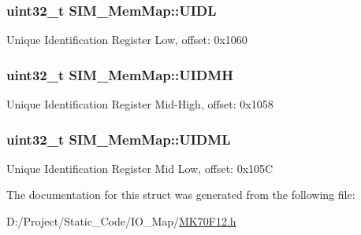 \subsubsection[{U\+I\+D\+L}]{\setlength{\rightskip}{0pt plus 5cm}uint32\+\_\+t S\+I\+M\+\_\+\+Mem\+Map\+::\+U\+I\+D\+L}\label{struct_s_i_m___mem_map_ac23a694afa8d84e55fc43ff0c0ec1b29}
Unique Identification Register Low, offset\+: 0x1060 \hypertarget{struct_s_i_m___mem_map_af4fb6d5bc3fa71f9c905570d87a2e93f}{}
\subsubsection[{U\+I\+D\+M\+H}]{\setlength{\rightskip}{0pt plus 5cm}uint32\+\_\+t S\+I\+M\+\_\+\+Mem\+Map\+::\+U\+I\+D\+M\+H}\label{struct_s_i_m___mem_map_af4fb6d5bc3fa71f9c905570d87a2e93f}
Unique Identification Register Mid-\/\+High, offset\+: 0x1058 \hypertarget{struct_s_i_m___mem_map_a51e871d8ac13db8b605b6ec1b3292be4}{}
\subsubsection[{U\+I\+D\+M\+L}]{\setlength{\rightskip}{0pt plus 5cm}uint32\+\_\+t S\+I\+M\+\_\+\+Mem\+Map\+::\+U\+I\+D\+M\+L}\label{struct_s_i_m___mem_map_a51e871d8ac13db8b605b6ec1b3292be4}
Unique Identification Register Mid Low, offset\+: 0x105\+C 

The documentation for this struct was generated from the following file\+:\begin{DoxyCompactItemize}
\item 
D\+:/\+Project/\+Static\+\_\+\+Code/\+I\+O\+\_\+\+Map/\hyperlink{_m_k70_f12_8h}{M\+K70\+F12.\+h}\end{DoxyCompactItemize}
